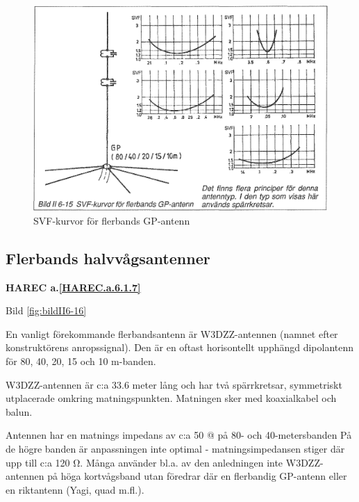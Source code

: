 \begin{figure}
  \includegraphics[width=\textwidth]{images/bild_2_6-15}
  \caption{SVF-kurvor för flerbands GP-antenn}
  \label{fig:bildII6-15}
\end{figure}

\subsection{Flerbands halvvågsantenner}
\textbf{
HAREC a.\ref{HAREC.a.6.1.7}\label{myHAREC.a.6.1.7}
}

Bild \ref{fig:bildII6-16}

En vanligt förekommande flerbandsantenn är W3DZZ-antennen (namnet
efter konstruktörens anropssignal). Den är en oftast horisontellt
upphängd dipolantenn för 80, 40, 20, 15 och 10 m-banden.

W3DZZ-antennen är c:a 33.6 meter lång och har två spärrkretsar,
symmetriskt utplacerade omkring matningspunkten. Matningen sker med
koaxialkabel och balun.

Antennen har en matnings impedans av c:a 50 @ på 80- och
40-metersbanden På de högre banden är anpassningen inte optimal -
matningsimpedansen stiger där upp till c:a 120 Ω. Många använder
bl.a. av den anledningen inte W3DZZ-antennen på höga kortvågsband utan
föredrar där en flerbandig GP-antenn eller en riktantenn (Yagi, quad
m.fl.).

